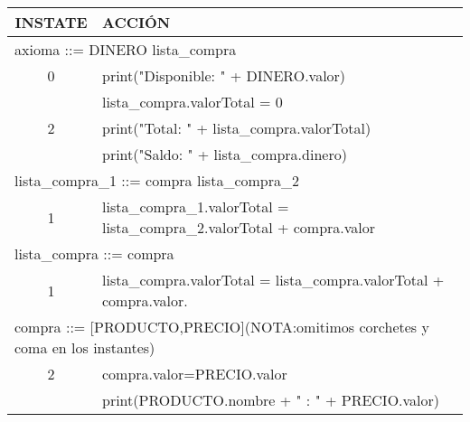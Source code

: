 \begin{problem}[4]
\begin{tabular}{|c|l|}
\hline
INSTATE & ACCIÓN \\
\hline
\multicolumn{2}{|l|}{axioma ::= DINERO lista\_compra} \\
\hline
 0 & print("Disponible: " + DINERO.valor) \\ & lista\_compra.valorTotal = 0\\
 \hline
 2 &
  print("Total: " + lista\_compra.valorTotal) \\ &
  print("Saldo: " + lista\_compra.dinero)\\
 \hline
\multicolumn{2}{|l|}{lista\_compra\_1 ::= compra lista\_compra\_2} \\
\hline
 1 & lista\_compra\_1.valorTotal = lista\_compra\_2.valorTotal + compra.valor \\
\hline
\multicolumn{2}{|l|}{lista\_compra ::= compra} \\
\hline
 1 & lista\_compra.valorTotal = lista\_compra.valorTotal + compra.valor. \\
\hline
\multicolumn{2}{|l|}{compra ::= [PRODUCTO,PRECIO](NOTA:omitimos corchetes y coma en los instantes)}\\
\hline
2 & compra.valor=PRECIO.valor \\ & print(PRODUCTO.nombre + " : " + PRECIO.valor)\\
\hline

\end{tabular}


\end{problem}

